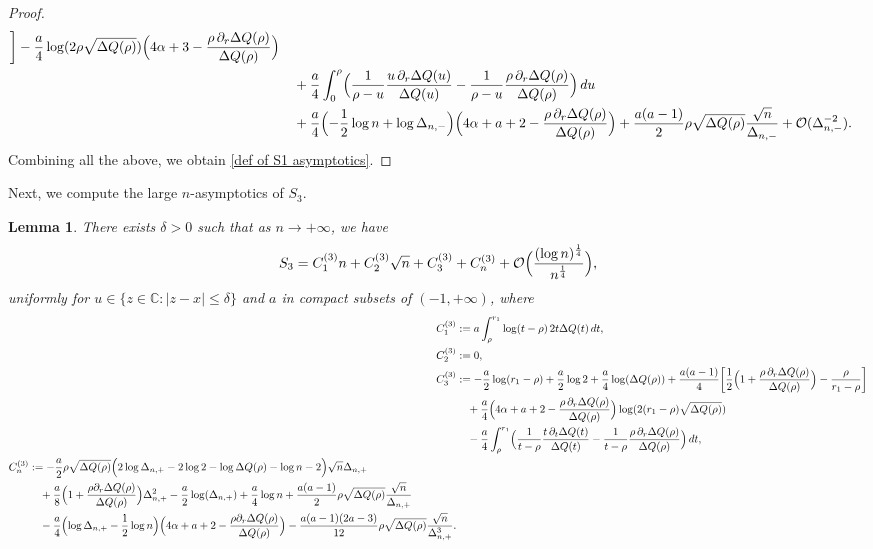 \documentclass[reqno]{amsart}
\newcommand{\1}{\mathds{1}}
\newcommand{\C}{\mathds{C}}
\numberwithin{equation}{section}
\newtheorem{lemma}[theorem]{Lemma}
\theoremstyle{definition}
\begin{document}
\begin{proof}
\begin{align*}
\bigg]
-\frac{a}{4}
\log(2\rho\sqrt{\Delta Q(\rho)})
\Bigl(4\alpha+3-\frac{\rho\,\partial_r\Delta Q(\rho)}{\Delta Q(\rho)}\Bigr)
\\
&\quad
+\frac{a}{4}\int_{0}^{\rho}\Bigl(\frac{1}{\rho-u}\frac{u\,\partial_r\Delta Q(u)}{\Delta Q(u)}-\frac{1}{\rho-u}\frac{\rho\,\partial_r\Delta Q(\rho)}{\Delta Q(\rho)}\Bigr)\,du
\\
&\quad
+\frac{a}{4}\Bigl(
-\frac{1}{2}\log n+\log\Delta_{n,-}
\Bigr)
\Bigl(4\alpha+a+2-\frac{\rho\,\partial_r\Delta Q(\rho)}{\Delta Q(\rho)}\Bigr)
+\frac{a(a-1)}{2}
\rho\sqrt{\Delta Q(\rho)}\frac{\sqrt{n}}{\Delta_{n,-}}
+\mathcal{O}(\Delta_{n,-}^{-2}). 
\end{align*}
Combining all the above, we obtain \eqref{def of S1 asymptotics}.
\end{proof}
Next, we compute the large $n$-asymptotics of $S_3$. 
\begin{lemma}\label{lemma:S3}
There exists $\delta>0$ such that as $n\to+\infty$, we have 
\begin{equation}
\label{def of S3 asymptotics}
 S_3=
 C_1^{(3)}n+C_2^{(3)}\sqrt{n}+C_3^{(3)}+C_n^{(3)}+\mathcal{O}\Bigl(\frac{(\log n)^{\frac{1}{4}}}{n^{\frac{1}{4}}}\Bigr),
\end{equation}
uniformly for $u\in\{z\in\C:|z-x|\leq \delta\}$ and $a$ in compact subsets of $(-1,+\infty)$, where 
\begin{align*}
C_1^{(3)}&:=
a\int_{\rho}^{r_1}\log (t-\rho)\,2t\Delta Q(t)\,dt,
\\
C_2^{(3)}&:=0, 
\\
C_3^{(3)}&:=
-\frac{a}{2}\log(r_1-\rho)
+\frac{a}{2}\log2
+\frac{a}{4}\log(\Delta Q(\rho))
+\frac{a(a-1)}{4}\bigg[\frac{1}{2}\Bigl(1+\frac{\rho\,\partial_r\Delta Q(\rho)}{\Delta Q(\rho)}\Bigr)-\frac{\rho}{r_1-\rho}\bigg]
\\
&\quad
+\frac{a}{4}\Bigl(4\alpha+a+2-\frac{\rho\,\partial_r\Delta Q(\rho)}{\Delta Q(\rho)}\Bigr)\log(2(r_1-\rho)\sqrt{\Delta Q(\rho)})
\\
&\quad
-\frac{a}{4}\int_{\rho}^{r_1}\Bigl(\frac{1}{t-\rho}\frac{t\,\partial_t\Delta Q(t)}{\Delta Q(t)}-\frac{1}{t-\rho}\frac{\rho\,\partial_r\Delta Q(\rho)}{\Delta Q(\rho)}\Bigr)\,dt, 
\\
\begin{split}
C_n^{(3)}&:=
-\frac{a}{2}\rho\sqrt{\Delta Q(\rho)}
\Bigl( 
2\log\Delta_{n,+}-2\log 2-\log\Delta Q(\rho)-\log n-2
\Bigr)\sqrt{n}\Delta_{n,+}
\\
&\quad
+\frac{a}{8}\Bigl(1+\frac{\rho\partial_r\Delta Q(\rho)}{\Delta Q(\rho)}\Bigr)\Delta_{n,+}^2
-\frac{a}{2}\log(\Delta_{n,+})
+\frac{a}{4}\log n
+\frac{a(a-1)}{2}\rho\sqrt{\Delta Q(\rho)}\frac{\sqrt{n}}{\Delta_{n,+}}
\\
&\quad
-\frac{a}{4}
\Bigl( 
\log\Delta_{n,+}-\frac{1}{2}\log n
\Bigr)
\Bigl(
4\alpha+a+2-\frac{\rho\partial_r\Delta Q(\rho)}{\Delta Q(\rho)}
\Bigr)
-\frac{a(a-1)(2a-3)}{12}\rho\sqrt{\Delta Q(\rho)}\frac{\sqrt{n}}{\Delta_{n,+}^3}. 
\end{split}
\end{align*}


\end{lemma}
\end{document}
